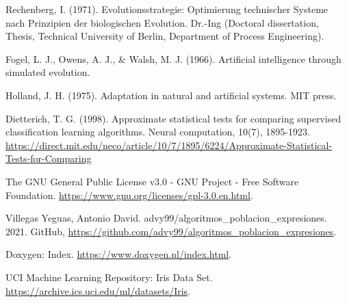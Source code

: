 \begin{thebibliography}{9}

	Rechenberg, I. (1971). Evolutionsstrategie: Optimierung technischer Systeme nach Prinzipien der biologischen Evolution. Dr.-Ing (Doctoral dissertation, Thesis, Technical University of Berlin, Department of Process Engineering).


	Fogel, L. J., Owens, A. J., \& Walsh, M. J. (1966). Artificial intelligence through simulated evolution.


	Holland, J. H. (1975). Adaptation in natural and artificial systems. MIT press.


	Dietterich, T. G. (1998). Approximate statistical tests for comparing supervised classification learning algorithms. Neural computation, 10(7), 1895-1923. \url{https://direct.mit.edu/neco/article/10/7/1895/6224/Approximate-Statistical-Tests-for-Comparing}


	The GNU General Public License v3.0 - GNU Project - Free Software Foundation. \url{https://www.gnu.org/licenses/gpl-3.0.en.html}.


	Villegas Yeguas, Antonio David. advy99/algoritmos\_poblacion\_expresiones. 2021. GitHub, \url{https://github.com/advy99/algoritmos_poblacion_expresiones}.


	Doxygen: Index. \url{https://www.doxygen.nl/index.html}.


	UCI Machine Learning Repository: Iris Data Set. \url{https://archive.ics.uci.edu/ml/datasets/Iris}.

\end{thebibliography}
